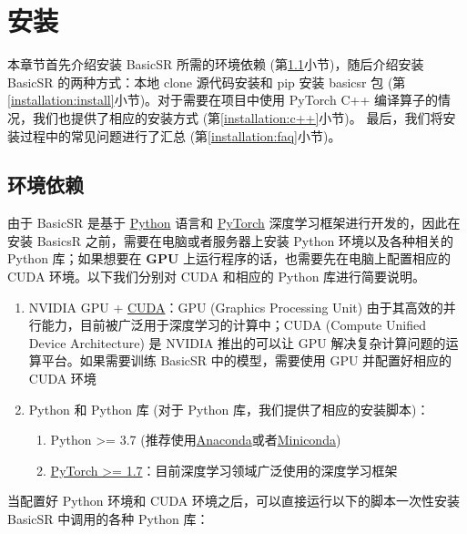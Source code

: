 \documentclass[../main.tex]{subfiles}
\begin{document}
\chapter{安装}
\vspace{-2cm}

本章节首先介绍安装 BasicSR 所需的环境依赖 (第\ref{installation:env-reqirement}小节)，随后介绍安装 BasicSR 的两种方式：本地 clone 源代码安装和 pip 安装 basicsr 包 (第\ref{installation:install}小节)。对于需要在项目中使用 PyTorch C++ 编译算子的情况，我们也提供了相应的安装方式 (第\ref{installation:c++}小节)。
最后，我们将安装过程中的常见问题进行了汇总 (第\ref{installation:faq}小节)。

\section{环境依赖}\label{installation:env-reqirement}

由于 BasicSR 是基于 \href{https://www.python.org/}{Python} 语言和 \href{https://pytorch.org/}{PyTorch} 深度学习框架进行开发的，因此在安装 BasicsR 之前，需要在电脑或者服务器上安装 Python 环境以及各种相关的 Python 库；如果想要在 \textbf{GPU} 上运行程序的话，也需要先在电脑上配置相应的 CUDA 环境。以下我们分别对 CUDA 和相应的 Python 库进行简要说明。

\begin{enumerate}
    \item NVIDIA GPU + \href{https://developer.nvidia.com/cuda-downloads}{CUDA}：GPU (Graphics Processing Unit) 由于其高效的并行能力，目前被广泛用于深度学习的计算中；CUDA (Compute Unified Device Architecture) 是 NVIDIA 推出的可以让 GPU 解决复杂计算问题的运算平台。如果需要训练 BasicSR 中的模型，需要使用 GPU 并配置好相应的 CUDA 环境
    \item Python 和 Python 库 (对于 Python 库，我们提供了相应的安装脚本)：
          \begin{enumerate}
              \item Python >= 3.7 (推荐使用\href{https://www.anaconda.com/products/distribution#linux}{Anaconda}或者\href{https://docs.conda.io/en/latest/miniconda.html}{Miniconda})
              \item \href{https://pytorch.org/}{PyTorch >= 1.7}：目前深度学习领域广泛使用的深度学习框架
          \end{enumerate}
\end{enumerate}

当配置好 Python 环境和 CUDA 环境之后，可以直接运行以下的脚本一次性安装 BasicSR 中调用的各种 Python 库：
\end{document}
